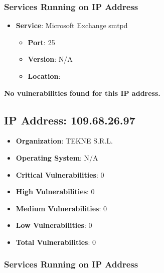 \documentclass{article}
\begin{document}
\subsubsection*{Services Running on IP Address}

\begin{itemize}
    
        \item \textbf{Service}: Microsoft Exchange smtpd
        \begin{itemize}
            \item \textbf{Port}: 25
            \item \textbf{Version}:  N/A 
            \item \textbf{Location}: \href{  }{  }
        \end{itemize}
    
\end{itemize}


\textbf{No vulnerabilities found for this IP address.}




\clearpage



\subsection{IP Address: 109.68.26.97}

\begin{itemize}
    \item \textbf{Organization}: TEKNE S.R.L.
    \item \textbf{Operating System}:  N/A 
    \item \textbf{Critical Vulnerabilities}: 0
    \item \textbf{High Vulnerabilities}: 0
    \item \textbf{Medium Vulnerabilities}: 0
    \item \textbf{Low Vulnerabilities}: 0
    \item \textbf{Total Vulnerabilities}: 0
\end{itemize}

\subsubsection*{Services Running on IP Address}
\end{document}
